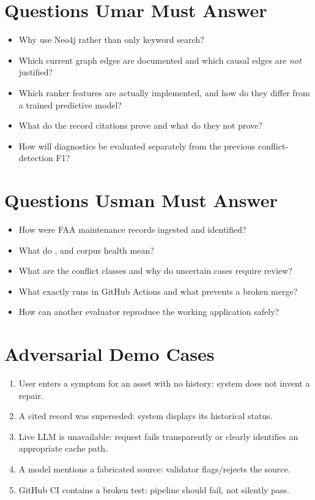 \documentclass[11pt,a4paper,oneside]{report}
\newcommand{\file}[1]{\path{#1}}
\begin{document}
\section{Questions Umar Must Answer}
\begin{itemize}
\item Why use Neo4j rather than only keyword search?
\item Which current graph edges are documented and which causal edges are \emph{not} justified?
\item Which ranker features are actually implemented, and how do they differ from a trained predictive model?
\item What do the record citations prove and what do they not prove?
\item How will diagnostics be evaluated separately from the previous conflict-detection F1?
\end{itemize}

\section{Questions Usman Must Answer}
\begin{itemize}
\item How were FAA maintenance records ingested and identified?
\item What do \file{graph_mode}, \file{llm_mode} and corpus health mean?
\item What are the conflict classes and why do uncertain cases require review?
\item What exactly runs in GitHub Actions and what prevents a broken merge?
\item How can another evaluator reproduce the working application safely?
\end{itemize}

\section{Adversarial Demo Cases}
\begin{enumerate}
\item User enters a symptom for an asset with no history: system does not invent a repair.
\item A cited record was superseded: system displays its historical status.
\item Live LLM is unavailable: request fails transparently or clearly identifies an appropriate cache path.
\item A model mentions a fabricated source: validator flags/rejects the source.
\item GitHub CI contains a broken test: pipeline should fail, not silently pass.
\end{enumerate}
\end{document}
